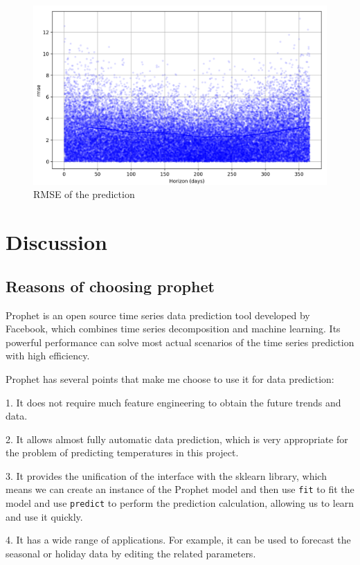 \documentclass{article}
\begin{document}
\begin{figure}[h]
\centering
\includegraphics[width=12cm]{rmse.png} %
\caption{RMSE of the prediction} %
\end{figure}



\newpage


\section{Discussion}

\subsection{Reasons of choosing prophet}

Prophet is an open source time series data prediction tool developed by Facebook, which combines time series decomposition and machine learning. Its powerful performance can solve most actual scenarios of the time series prediction with high efficiency.

Prophet has several points that make me choose to use it for data prediction:

1. It does not require much feature engineering to obtain the future trends and data.

2. It allows almost fully automatic data prediction, which is very appropriate for the problem of predicting temperatures in this project. 

3. It provides the unification of the interface with the sklearn library, which means we can create an instance of the Prophet model and then use \verb|fit| to fit the model and use \verb|predict| to perform the prediction calculation, allowing us to learn and use it quickly.

4. It has a wide range of applications. For example, it can be used to forecast the seasonal or holiday data by editing the related parameters.
\end{document}
